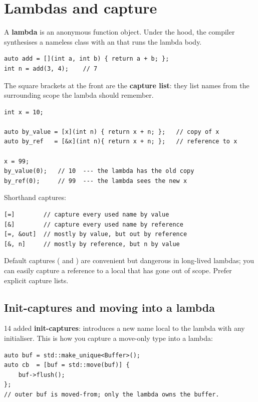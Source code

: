 \section{Lambdas and capture}
\label{sec:cpp:lambdas}

A \textbf{lambda} is an anonymous function object. Under the hood,
the compiler synthesises a nameless class with an 
that runs the lambda body.

\begin{lstlisting}
auto add = [](int a, int b) { return a + b; };
int n = add(3, 4);    // 7
\end{lstlisting}

The square brackets at the front are the \textbf{capture list}: they
list names from the surrounding scope the lambda should remember.

\begin{lstlisting}
int x = 10;

auto by_value = [x](int n) { return x + n; };   // copy of x
auto by_ref   = [&x](int n){ return x + n; };   // reference to x

x = 99;
by_value(0);   // 10  --- the lambda has the old copy
by_ref(0);     // 99  --- the lambda sees the new x
\end{lstlisting}

Shorthand captures:

\begin{lstlisting}
[=]        // capture every used name by value
[&]        // capture every used name by reference
[=, &out]  // mostly by value, but out by reference
[&, n]     // mostly by reference, but n by value
\end{lstlisting}

Default captures (\code{[=]} and \code{[\&]}) are convenient but
dangerous in long-lived lambdas; you can easily capture a reference
to a local that has gone out of scope. Prefer explicit capture lists.

\subsection{Init-captures and moving into a lambda}

\cpp{}14 added \textbf{init-captures}: \code{[name = expression]}
introduces a new name local to the lambda with any initialiser. This
is how you capture a move-only type into a lambda:

\begin{lstlisting}
auto buf = std::make_unique<Buffer>();
auto cb  = [buf = std::move(buf)] {
    buf->flush();
};
// outer buf is moved-from; only the lambda owns the buffer.
\end{lstlisting}

